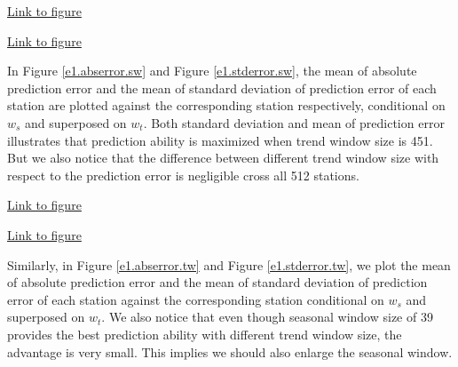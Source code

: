 \begin{framed}
\begin{center}
  \href{../plots/a1950/E1/tmax.mean.absmeans.error.sw.pdf}{Link to figure}
  \label{e1.abserror.sw}
\end{center}
\end{framed}

\begin{framed}
\begin{center}
  \href{../plots/a1950/E1/tmax.mean.std.error.sw.pdf}{Link to figure}
  \label{e1.stderror.sw}
\end{center}
\end{framed}

In Figure \href{../plots/tmax.mean.absmeans.error.tw.pdf}{\ref*{e1.abserror.sw}}
and Figure \href{../plots/tmax.mean.std.error.tw.pdf}{\ref*{e1.stderror.sw}}, 
the mean of absolute prediction error and the mean of standard deviation of 
prediction error of each station are plotted against the corresponding station
respectively, conditional on $w_s$ and superposed on $w_t$. Both standard 
deviation and mean of prediction error illustrates that prediction ability is
maximized when trend window size is 451. But we also notice that the difference
between different trend window size with respect to the prediction error is 
negligible cross all 512 stations. 

\begin{framed}
\begin{center}
  \href{../plots/a1950/E1/tmax.mean.absmeans.error.tw.pdf}{Link to figure}
  \label{e1.abserror.tw}
\end{center}
\end{framed}

\begin{framed}
\begin{center}
  \href{../plots/a1950/E1/tmax.mean.std.error.tw.pdf}{Link to figure}
  \label{e1.stderror.tw}
\end{center}
\end{framed}

Similarly, in 
Figure \href{../plots/tmax.mean.absmeans.error.tw.pdf}{\ref*{e1.abserror.tw}}
and Figure \href{../plots/tmax.mean.std.error.tw.pdf}{\ref*{e1.stderror.tw}}, 
we plot the mean of absolute prediction error and the mean of standard deviation 
of prediction error of each station against the corresponding station conditional 
on $w_s$ and superposed on $w_t$. We also notice that even though seasonal window
size of 39 provides the best prediction ability with different trend window size,
the advantage is very small. This implies we should also enlarge the seasonal 
window.  

